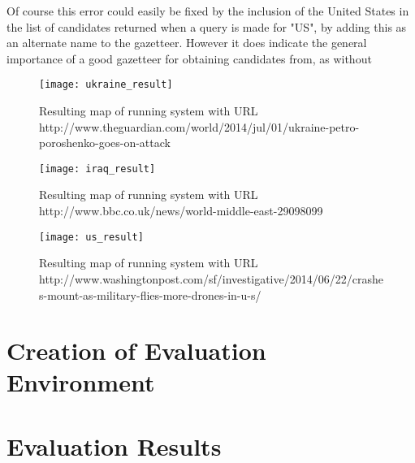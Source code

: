 \documentclass[12pt, a4paper]{report}
\begin{document}
Of course this error could easily be fixed by the inclusion of the United States in the list of candidates returned when a query is made for "US", by adding this as an alternate name to the gazetteer. However it does indicate the general importance of a good gazetteer for obtaining candidates from, as without 

 





\begin{figure}[h!]
  \centering
  \texttt{[image: ukraine\_result]}
  \caption{Resulting map of running system with URL http://www.theguardian.com/world/2014/jul/01/ukraine-petro-poroshenko-goes-on-attack}
  \label{fig:ukraine_result}
\end{figure}

\begin{figure}[h!]
  \centering
  \texttt{[image: iraq\_result]}
  \caption{Resulting map of running system with URL http://www.bbc.co.uk/news/world-middle-east-29098099}
  \label{fig:iraq_result}
\end{figure}

\begin{figure}[h!]
  \centering
  \texttt{[image: us\_result]}
  \caption{Resulting map of running system with URL http://www.washingtonpost.com/sf/investigative/2014/06/22/crashes-mount-as-military-flies-more-drones-in-u-s/}
  \label{fig:us_result}
\end{figure}


\section{Creation of Evaluation Environment}
\label{sec:creation_evaluation_environment}

\section{Evaluation Results}
\label{sec:evaluation_results}

\end{document}
